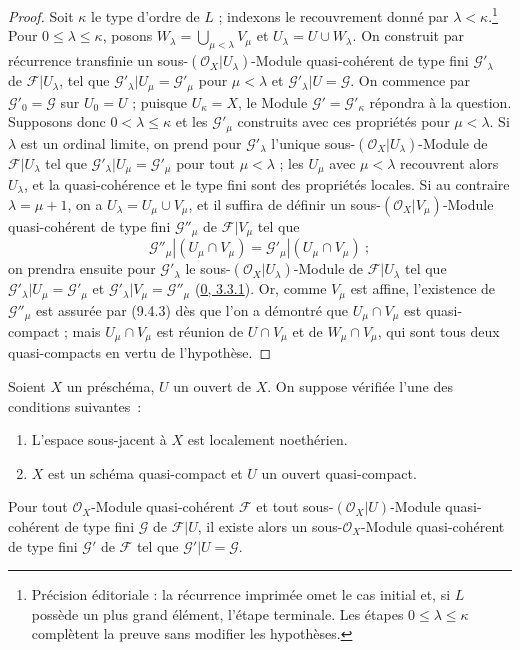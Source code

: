 \begin{proof}
Soit $\kappa$ le type d'ordre de $L$ ; indexons le recouvrement donné par $\lambda<\kappa$.\footnote{Précision éditoriale : la récurrence imprimée omet le cas initial et, si $L$ possède un plus grand élément, l'étape terminale. Les étapes $0\leq\lambda\leq\kappa$ complètent la preuve sans modifier les hypothèses.}
Pour $0\leq\lambda\leq\kappa$, posons $W_\lambda=\bigcup_{\mu<\lambda}V_\mu$ et $U_\lambda=U\cup W_\lambda$.
On construit par récurrence transfinie un sous-$(\mathscr{O}_X|U_\lambda)$-Module quasi-cohérent de type fini $\mathscr{G}'_\lambda$ de $\mathscr{F}|U_\lambda$, tel que $\mathscr{G}'_\lambda|U_\mu=\mathscr{G}'_\mu$ pour $\mu<\lambda$ et $\mathscr{G}'_\lambda|U=\mathscr{G}$.
On commence par $\mathscr{G}'_0=\mathscr{G}$ sur $U_0=U$ ; puisque $U_\kappa=X$, le Module $\mathscr{G}'=\mathscr{G}'_\kappa$ répondra à la question.
Supposons donc $0<\lambda\leq\kappa$ et les $\mathscr{G}'_\mu$ construits avec ces propriétés pour $\mu<\lambda$.
Si $\lambda$ est un ordinal limite, on prend pour $\mathscr{G}'_\lambda$ l'unique sous-$(\mathscr{O}_X|U_\lambda)$-Module de $\mathscr{F}|U_\lambda$ tel que $\mathscr{G}'_\lambda|U_\mu=\mathscr{G}'_\mu$ pour tout $\mu<\lambda$ ; les $U_\mu$ avec $\mu<\lambda$ recouvrent alors $U_\lambda$, et la quasi-cohérence et le type fini sont des propriétés locales.
Si au contraire $\lambda=\mu+1$, on a $U_\lambda=U_\mu\cup V_\mu$, et il suffira de définir un
sous-$(\mathscr{O}_X|V_\mu)$-Module quasi-cohérent de type fini
$\mathscr{G}''_\mu$ de $\mathscr{F}|V_\mu$ tel que
\[
  \mathscr{G}''_\mu|(U_\mu\cap V_\mu)
  =\mathscr{G}'_\mu|(U_\mu\cap V_\mu)~;
\]
on prendra ensuite pour $\mathscr{G}'_\lambda$ le
sous-$(\mathscr{O}_X|U_\lambda)$-Module de $\mathscr{F}|U_\lambda$ tel que
$\mathscr{G}'_\lambda|U_\mu=\mathscr{G}'_\mu$ et
$\mathscr{G}'_\lambda|V_\mu=\mathscr{G}''_\mu$
(\hyperref[0.3.3.1-fr]{0, 3.3.1}). Or, comme $V_\mu$ est affine, l'existence
de $\mathscr{G}''_\mu$ est assurée par (9.4.3) dès que l'on a démontré que
$U_\mu\cap V_\mu$ est quasi-compact ; mais $U_\mu\cap V_\mu$ est réunion de
$U\cap V_\mu$ et de $W_\mu\cap V_\mu$, qui sont tous deux quasi-compacts en
vertu de l'hypothèse.
\end{proof}

\begin{theorem}[9.4.7]
\label{I.9.4.7-fr}
Soient $X$ un préschéma, $U$ un ouvert de $X$. On suppose vérifiée l'une des
conditions suivantes~:
\begin{enumerate}
  \item[(a)] L'espace sous-jacent à $X$ est localement noethérien.
  \item[(b)] $X$ est un schéma quasi-compact et $U$ un ouvert quasi-compact.
\end{enumerate}
Pour tout $\mathscr{O}_X$-Module quasi-cohérent $\mathscr{F}$ et tout
sous-$(\mathscr{O}_X|U)$-Module quasi-cohérent de type fini $\mathscr{G}$ de
$\mathscr{F}|U$, il existe alors un sous-$\mathscr{O}_X$-Module
quasi-cohérent de type fini $\mathscr{G}'$ de $\mathscr{F}$ tel que
$\mathscr{G}'|U=\mathscr{G}$.
\end{theorem}

